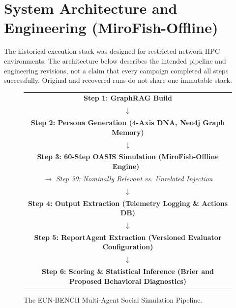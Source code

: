 \section{System Architecture and Engineering (MiroFish-Offline)}
\label{sec:architecture}

The historical execution stack was designed for restricted-network HPC environments. The architecture below describes the intended pipeline and engineering revisions, not a claim that every campaign completed all steps successfully. Original and recovered runs do not share one immutable stack.

\begin{figure}[!tbp]
\centering
\begin{tabular}{|c|}
\hline
\textbf{Step 1: GraphRAG Build} \\
$\downarrow$ \\
\textbf{Step 2: Persona Generation (4-Axis DNA, Neo4j Graph Memory)} \\
$\downarrow$ \\
\textbf{Step 3: 60-Step OASIS Simulation (MiroFish-Offline Engine)~\cite{yang2024,oasissoftware,mirofishoffline}} \\
$\rightarrow$ \textit{Step 30: Nominally Relevant vs. Unrelated Injection} \\
$\downarrow$ \\
\textbf{Step 4: Output Extraction (Telemetry Logging \& Actions DB)} \\
$\downarrow$ \\
\textbf{Step 5: ReportAgent Extraction (Versioned Evaluator Configuration)} \\
$\downarrow$ \\
\textbf{Step 6: Scoring \& Statistical Inference (Brier and Proposed Behavioral Diagnostics)} \\
\hline
\end{tabular}
\caption{The ECN-BENCH Multi-Agent Social Simulation Pipeline.}
\label{fig:pipeline}
\end{figure}

